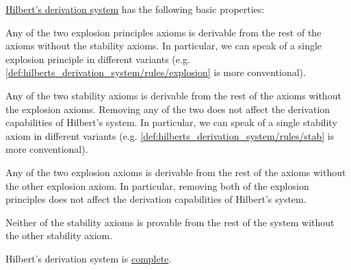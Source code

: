 \begin{proposition}\label{thm:hiblerts_derivation_system_properties}
  \hyperref[def:hilberts_derivation_system]{Hilbert's derivation system} has the following basic properties:

  \begin{PropEnum}
     Any of the two explosion principles axioms is derivable from the rest of the axioms without the stability axioms. In particular, we can speak of a single explosion principle in different variants (e.g. \eqref{def:hilberts_derivation_system/rules/explosion} is more conventional).

     Any of the two stability axioms is derivable from the rest of the axioms without the explosion axioms. Removing any of the two does not affect the derivation capabilities of Hilbert's system. In particular, we can speak of a single stability axiom in different variants (e.g. \eqref{def:hilberts_derivation_system/rules/stab} is more conventional).

     Any of the two explosion axioms is derivable from the rest of the axioms without the other explosion axiom. In particular, removing both of the explosion principles does not affect the derivation capabilities of Hilbert's system.

     Neither of the stability axioms is provable from the rest of the system without the other stability axiom.
  \end{PropEnum}
\end{proposition}

\begin{theorem}\label{thm:completeness_of_hilberts_derivation_system}
  Hilbert's derivation system is \hyperref[def:derivability_and_satisfiability/completeness]{complete}.
\end{theorem}

